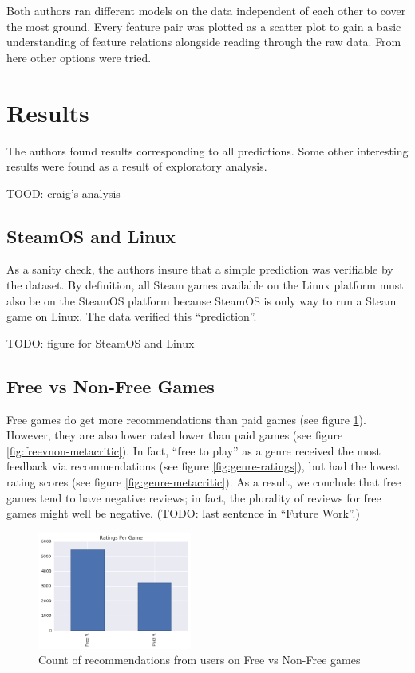 \documentclass[letterpaper,10pt,twocolumn]{article}
\begin{document}
Both authors ran different models on the data independent of each other to
cover the most ground. Every feature pair was plotted as a scatter plot to
gain a basic understanding of feature relations alongside reading through the
raw data. From here other options were tried.



\section{Results}

The authors found results corresponding to all predictions. Some other interesting
results were found as a result of exploratory analysis.

TOOD: craig's analysis

\subsection{SteamOS and Linux}

As a sanity check, the authors insure that a simple prediction was verifiable
by the dataset. By definition, all Steam games available on the Linux platform
must also be on the SteamOS platform because SteamOS is only way to run a Steam
game on Linux. The data verified this ``prediction''.

TODO: figure for SteamOS and Linux

\subsection{Free vs Non-Free Games}

Free games do get more recommendations than paid games (see figure
\ref{fig:freevnon-ratings}). However, they are also lower rated lower than paid
games (see figure \ref{fig:freevnon-metacritic}). In fact, ``free to play'' as a
genre received the most feedback via recommendations (see figure
\ref{fig:genre-ratings}), but had the lowest rating scores (see figure
\ref{fig:genre-metacritic}). As a result, we conclude that free games tend to
have negative reviews; in fact, the plurality of reviews for free games might
well be negative. (TODO: last sentence in ``Future Work''.)

\begin{figure}[H]
    \label{fig:freevnon-ratings}
    \caption{Count of recommendations from users on Free vs Non-Free games}
    \includegraphics[width=0.45\textwidth,keepaspectratio]{freevnon-ratings-bar}
\end{figure}
\end{document}
